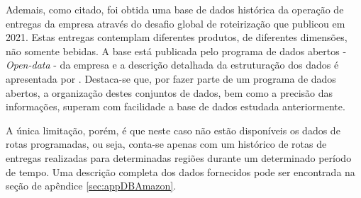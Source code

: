 Ademais, como citado, foi obtida uma base de dados histórica da operação de entregas da empresa através do desafio global de roteirização que publicou em 2021.
Estas entregas contemplam diferentes produtos, de diferentes dimensões, não somente bebidas.
A base está publicada pelo programa de dados abertos - \textit{Open-data} - da empresa e a descrição detalhada da estruturação dos dados é apresentada por .
Destaca-se que, por fazer parte de um programa de dados abertos, a organização destes conjuntos de dados, bem como a precisão das informações, superam com facilidade a base de dados estudada anteriormente.

A única limitação, porém, é que neste caso não estão disponíveis os dados de rotas programadas, ou seja, conta-se apenas com um histórico de rotas de entregas realizadas para determinadas regiões durante um determinado período de tempo.
Uma descrição completa dos dados fornecidos pode ser encontrada na seção de apêndice \ref{sec:appDBAmazon}.